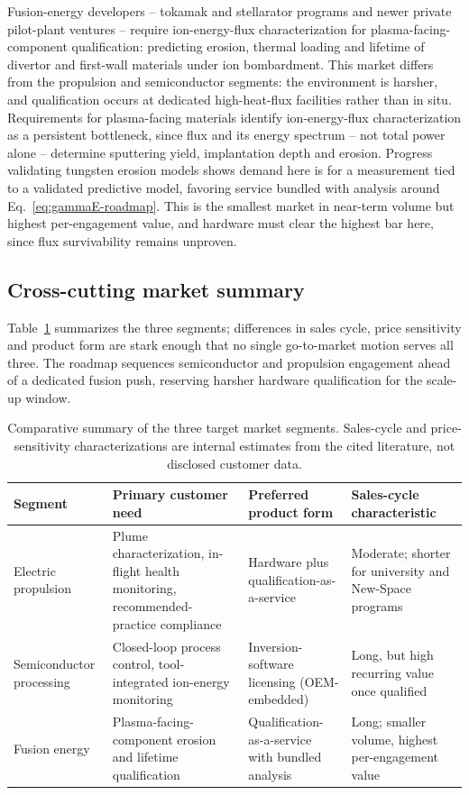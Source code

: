Fusion-energy developers -- tokamak and stellarator programs and newer private pilot-plant ventures -- require ion-energy-flux characterization for plasma-facing-component qualification: predicting erosion, thermal loading and lifetime of divertor and first-wall materials under ion bombardment. This market differs from the propulsion and semiconductor segments: the environment is harsher, and qualification occurs at dedicated high-heat-flux facilities \cite{ref0586,ref0588} rather than in situ. Requirements for plasma-facing materials \cite{ref0581} identify ion-energy-flux characterization as a persistent bottleneck, since flux and its energy spectrum -- not total power alone -- determine sputtering yield, implantation depth and erosion. Progress validating tungsten erosion models \cite{ref0593} shows demand here is for a measurement tied to a validated predictive model, favoring service bundled with analysis around Eq.~\eqref{eq:gammaE-roadmap}. This is the smallest market in near-term volume but highest per-engagement value, and hardware must clear the highest bar here, since flux survivability remains unproven.

\subsection{Cross-cutting market summary}

Table~\ref{tab:markets} summarizes the three segments; differences in sales cycle, price sensitivity and product form are stark enough that no single go-to-market motion serves all three. The roadmap sequences semiconductor and propulsion engagement ahead of a dedicated fusion push, reserving harsher hardware qualification for the scale-up window.

\begin{table}[htbp]
\centering
\caption{Comparative summary of the three target market segments. Sales-cycle and price-sensitivity characterizations are internal estimates from the cited literature, not disclosed customer data.}
\label{tab:markets}
\begin{tabularx}{\textwidth}{@{}l X X X@{}}
\toprule
Segment & Primary customer need & Preferred product form & Sales-cycle characteristic \\
\midrule
Electric propulsion & Plume characterization, in-flight health monitoring, recommended-practice compliance \cite{ref0490,ref0511} & Hardware plus qualification-as-a-service & Moderate; shorter for university and New-Space programs \\
Semiconductor processing & Closed-loop process control, tool-integrated ion-energy monitoring \cite{ref0539,ref0553} & Inversion-software licensing (OEM-embedded) & Long, but high recurring value once qualified \\
Fusion energy & Plasma-facing-component erosion and lifetime qualification \cite{ref0581,ref0593} & Qualification-as-a-service with bundled analysis & Long; smaller volume, highest per-engagement value \\
\bottomrule
\end{tabularx}
\end{table}

